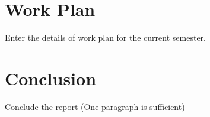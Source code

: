 \documentclass[twocolumn]{article}
\begin{document}
\section{Work Plan}
Enter the details of work plan for the current semester.

\section{Conclusion}
   Conclude the report (One paragraph is sufficient)


%
%
%
%
\end{document}
